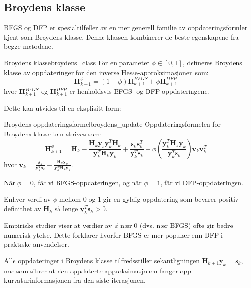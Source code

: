 \subsection{Broydens klasse}
BFGS og DFP er spesialtilfeller av en mer generell familie av oppdateringsformler kjent som Broydens klasse. Denne klassen kombinerer de beste egenskapene fra begge metodene.

\begin{definition}{Broydens klasse}{broydens_class}
  For en parameter $\phi \in [0,1]$, defineres Broydens klasse av oppdateringer for den inverse Hesse-approksimasjonen som:
  \[
    \symbf{H}_{k+1}^\phi = (1-\phi)\symbf{H}_{k+1}^{BFGS} + \phi\symbf{H}_{k+1}^{DFP}
  \]
  hvor $\symbf{H}_{k+1}^{BFGS}$ og $\symbf{H}_{k+1}^{DFP}$ er henholdsvis BFGS- og DFP-oppdateringene.
\end{definition}

Dette kan utvides til en eksplisitt form:

\begin{proposition}{Broydens oppdateringsformel}{broydens_update}
  Oppdateringsformelen for Broydens klasse kan skrives som:
  \[
    \symbf{H}_{k+1}^\phi = \symbf{H}_k - \frac{\symbf{H}_k\symbf{y}_k\symbf{y}_k^T\symbf{H}_k}{\symbf{y}_k^T\symbf{H}_k\symbf{y}_k} + \frac{\symbf{s}_k\symbf{s}_k^T}{\symbf{y}_k^T\symbf{s}_k} + \phi\left(\frac{\symbf{y}_k^T\symbf{H}_k\symbf{y}_k}{\symbf{y}_k^T\symbf{s}_k}\right)\symbf{v}_k\symbf{v}_k^T
  \]
  hvor $\symbf{v}_k = \frac{\symbf{s}_k}{\symbf{y}_k^T\symbf{s}_k} - \frac{\symbf{H}_k\symbf{y}_k}{\symbf{y}_k^T\symbf{H}_k\symbf{y}_k}$.

  Når $\phi = 0$, får vi BFGS-oppdateringen, og når $\phi = 1$, får vi DFP-oppdateringen. 
  
  Enhver verdi av $\phi$ mellom 0 og 1 gir en gyldig oppdatering som bevarer positiv definithet av $\symbf{H}_k$ så lenge $\symbf{y}_k^T\symbf{s}_k > 0$.
\end{proposition}

\begin{remark}
  Empiriske studier viser at verdier av $\phi$ nær 0 (dvs. nær BFGS) ofte gir bedre numerisk ytelse. %
  Dette forklarer hvorfor BFGS er mer populær enn DFP i praktiske anvendelser.
\end{remark}

Alle oppdateringer i Broydens klasse tilfredsstiller sekantligningen $\symbf{H}_{k+1}\symbf{y}_k = \symbf{s}_k$, noe som sikrer at den oppdaterte approksimasjonen fanger opp kurvaturinformasjonen fra den siste iterasjonen.

